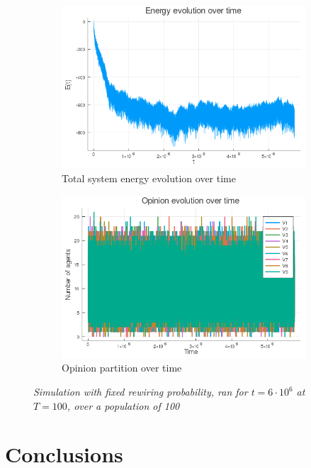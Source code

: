 \documentclass[12pt,openright,twoside]{book}
\begin{document}
\begin{figure}[!htb]
\centering
\begin{subfigure}{0.47\linewidth}
    \includegraphics[width=\linewidth]{figures/2_2_t100/energy_evolution.png}
    \caption{Total system energy evolution over time}
\end{subfigure}
\begin{subfigure}{0.47\linewidth}
    \includegraphics[width=\linewidth]{figures/2_2_t100/vote_evolution.png}
    \caption{Opinion partition over time}
\end{subfigure}
\caption{\textit{{\small Simulation with fixed rewiring probability, ran for $t=6\cdot 10^6$ at $T=100$, over a population of 100}}}
\label{2_2_t100:ener_inne}
\end{figure}

\chapter{Conclusions}
\end{document}
